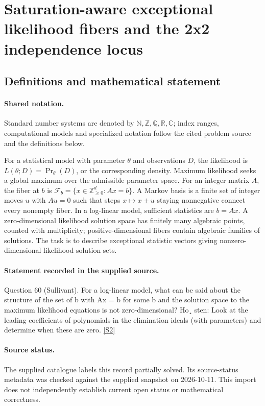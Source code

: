 \documentclass[11pt]{article}
\newcommand{\sref}[2]{\hyperlink{source:#1:#2}{[S#2]}}
\begin{document}
\section{Saturation-aware exceptional likelihood fibers and the 2x2 independence locus}\label{statement}

\subsection{Definitions and mathematical statement}

\paragraph{Shared notation.}Standard number systems are denoted by $\mathbb N,\mathbb Z,\mathbb Q,\mathbb R,\mathbb C$; index ranges, computational models and specialized notation follow the cited problem source and the definitions below.


For a statistical model with parameter $\theta$ and observations $D$, the likelihood is $L(\theta;D)=\Pr_\theta(D)$, or the corresponding density. Maximum likelihood seeks a global maximum over the admissible parameter space. For an integer matrix $A$, the fiber at $b$ is $\mathcal F_b=\{x\in\mathbb Z_{\ge0}^d:Ax=b\}$. A Markov basis is a finite set of integer moves $u$ with $Au=0$ such that steps $x\mapsto x\pm u$ staying nonnegative connect every nonempty fiber. In a log-linear model, sufficient statistics are $b=Ax$. A zero-dimensional likelihood solution space has finitely many algebraic points, counted with multiplicity; positive-dimensional fibers contain algebraic families of solutions. The task is to describe exceptional statistic vectors giving nonzero-dimensional likelihood solution sets.
\paragraph{Statement recorded in the supplied source.}
Question 60 (Sullivant). For a log-linear model, what can be said about the structure of the set of b with Ax = b for some b and the solution space to the maximum likelihood equations is not zero-dimensional? Ho¸ sten: Look at the leading coefficients of polynomials in the elimination ideals (with parameters) and determine when these are zero. \sref{statement}{2}
\paragraph{Source status.}
The supplied catalogue labels this record partially solved. Its source-status metadata was checked against the supplied snapshot on 2026-10-11. This import does not independently establish current open status or mathematical correctness.
\end{document}
